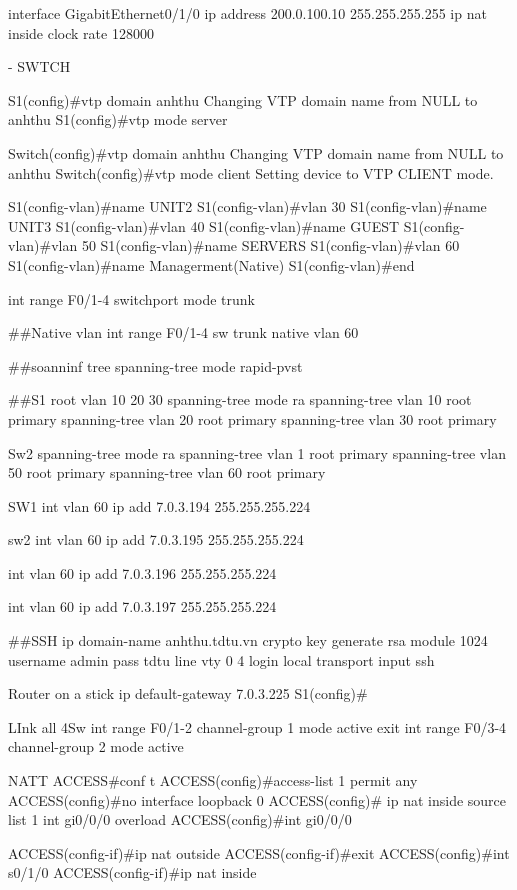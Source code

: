 \documentclass[13pt]{article}
\begin{document}
interface GigabitEthernet0/1/0
 ip address 200.0.100.10 255.255.255.255
 ip nat inside
clock rate 128000

- SWTCH

S1(config)#vtp domain anhthu
Changing VTP domain name from NULL to anhthu
S1(config)#vtp mode server

Switch(config)#vtp domain anhthu
Changing VTP domain name from NULL to anhthu
Switch(config)#vtp mode client
Setting device to VTP CLIENT mode.

S1(config-vlan)#name UNIT2
S1(config-vlan)#vlan 30
S1(config-vlan)#name UNIT3
S1(config-vlan)#vlan 40
S1(config-vlan)#name GUEST
S1(config-vlan)#vlan 50
S1(config-vlan)#name SERVERS
S1(config-vlan)#vlan 60 
S1(config-vlan)#name Managerment(Native)
S1(config-vlan)#end

int range F0/1-4
switchport mode trunk


##Native vlan
int range F0/1-4
sw trunk native vlan 60


##soanninf tree
spanning-tree mode rapid-pvst

##S1 root vlan 10 20 30
spanning-tree mode ra
spanning-tree vlan 10 root primary
spanning-tree vlan 20 root primary
spanning-tree vlan 30 root primary


Sw2
spanning-tree mode ra
spanning-tree vlan 1 root primary
spanning-tree vlan 50 root primary
spanning-tree vlan 60 root primary


SW1
int vlan 60
ip add 7.0.3.194 255.255.255.224


sw2
int vlan 60
ip add 7.0.3.195 255.255.255.224

int vlan 60
ip add 7.0.3.196 255.255.255.224

int vlan 60
ip add 7.0.3.197 255.255.255.224


##SSH
ip domain-name anhthu.tdtu.vn
crypto key generate rsa 
module 1024
username admin pass tdtu
line vty 0 4
login local
transport input ssh



Router on a stick
ip default-gateway 7.0.3.225
S1(config)#



LInk all
4Sw
int range F0/1-2
channel-group 1 mode active
exit
int range F0/3-4
channel-group 2 mode active


NATT
ACCESS#conf t
ACCESS(config)#access-list 1 permit any
ACCESS(config)#no interface loopback 0
ACCESS(config)#
ip nat inside source list 1 int gi0/0/0 overload
ACCESS(config)#int gi0/0/0

ACCESS(config-if)#ip nat outside
ACCESS(config-if)#exit
ACCESS(config)#int s0/1/0
ACCESS(config-if)#ip nat inside
\end{document}
